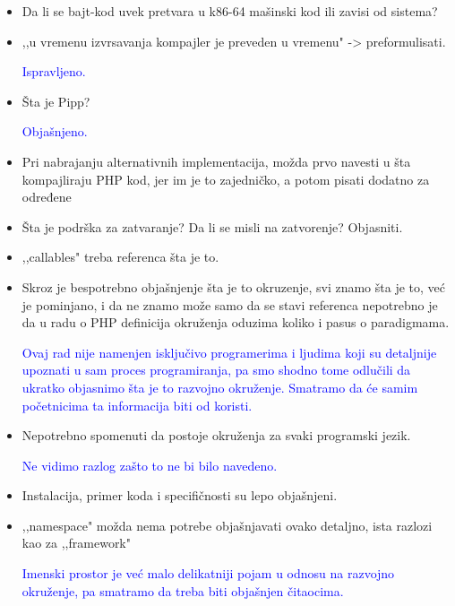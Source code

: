 \documentclass[a4paper]{report}
\newcommand{\odgovor}[1]{\textcolor{blue}{#1}}
\begin{document}
\begin{itemize}
\item Da li se bajt-kod uvek pretvara u k86-64 mašinski kod ili zavisi od sistema?

\odgovor{}

\item ,,u vremenu izvrsavanja kompajler je preveden u vremenu" -> preformulisati.

\odgovor{Ispravljeno.}

\item Šta je Pipp?

\odgovor{Objašnjeno.}

\item Pri nabrajanju alternativnih implementacija, možda prvo navesti u šta kompajliraju PHP kod, jer im je to zajedničko, a potom pisati dodatno za određene

\odgovor{}

\item Šta je podrška za zatvaranje? Da li se misli na zatvorenje? Objasniti.

\odgovor{}

\item ,,callables" treba referenca šta je to.

\odgovor{}

\item Skroz je bespotrebno objašnjenje šta je to okruzenje, svi znamo šta je to, već je pominjano, i da ne znamo može samo da se stavi referenca nepotrebno je da u radu o PHP definicija okruženja oduzima koliko i pasus o paradigmama.

\odgovor{Ovaj rad nije namenjen isključivo programerima i ljudima koji su detaljnije upoznati u sam proces programiranja, pa smo shodno tome odlučili da ukratko objasnimo šta je to razvojno okruženje. Smatramo da će samim početnicima ta informacija biti od koristi.}

\item Nepotrebno spomenuti da postoje okruženja za svaki programski jezik.

\odgovor{Ne vidimo razlog zašto to ne bi bilo navedeno.}

\item Instalacija, primer koda i specifičnosti su lepo objašnjeni.

\item ,,namespace" možda nema potrebe objašnjavati ovako detaljno, ista razlozi kao za ,,framework"

\odgovor{Imenski prostor je već malo delikatniji pojam u odnosu na razvojno okruženje, pa smatramo da treba biti objašnjen čitaocima. }


\end{itemize}
\end{document}

